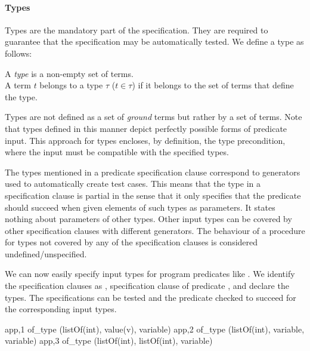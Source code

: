 \paragraph{\bf Types}

Types are the mandatory part of the specification.
%
They are required to guarantee that the specification may be
automatically tested.
%
We define a type as follows: 
%
\begin{definition}
\label{def:type}
A {\em type} is a non-empty set of terms.\\
A term $t$ belongs to a type $\tau$ ($t \in \tau$) if it belongs to the set of
terms that define the type.
\end{definition}


Types are not defined as a set of \emph{ground} terms but rather by
a set of terms.
%
%
Note that types defined in this manner depict perfectly possible forms of
predicate input.
%
This approach for types %
encloses, by definition, the type
precondition, where the input must be compatible with the specified types.


The types mentioned in a predicate specification clause correspond to \plqc{}
generators used to automatically create %
test cases.
%
This means that the type in a specification clause is partial in the
sense that it only specifies that the predicate should succeed when given
elements of such types as parameters.
%
It states nothing about parameters of other types.
%
Other input types can be covered by other specification clauses with
different generators.
%
The %
behaviour of a procedure
for types not covered by any of the
specification clauses is considered undefined/unspecified.


We can now easily specify input types for program predicates like .
%
We identify the specification clauses as , specification
clause  of predicate , and declare the \plqc{} types.
%
The specifications can be tested and the predicate checked to succeed
for the corresponding input types.
%
\begin{yapcode}
 {app,1} of_type (listOf(int), value(v), variable)
 {app,2} of_type (listOf(int), variable, variable)
 {app,3} of_type (listOf(int), listOf(int), variable)
\end{yapcode}


